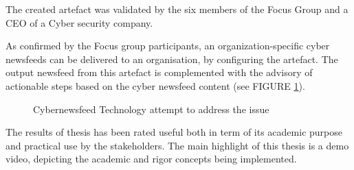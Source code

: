 
The created artefact was validated by the six members of the Focus Group and a CEO of a Cyber security company.




As confirmed by the Focus group participants, 
an  organization-specific cyber newsfeeds can be delivered to an organisation, by configuring the artefact. 
The output newsfeed from this artefact is complemented with the advisory of actionable steps based on the cyber newsfeed content
(see FIGURE \ref{fig:problem-context}).

\begin{figure}[ht]
    \centering
    \caption{Cybernewsfeed Technology attempt to address the issue}
    \label{fig:problem-context}
\end{figure}

The results of thesis has been rated useful both in term of its academic purpose and practical use by the stakeholders. The main highlight of this thesis is a demo video, depicting  the academic and rigor concepts being implemented.







